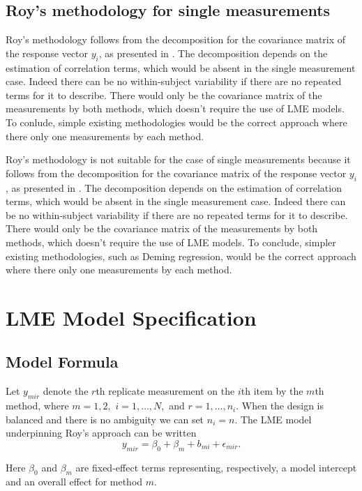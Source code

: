 \documentclass[12pt, a4paper]{report}
\theoremstyle{plain}
\theoremstyle{definition}
\theoremstyle{remark}
\begin{document}
	
	\subsection{Roy's methodology for single measurements}
	Roy's methodology follows from the decomposition for the covariance matrix of the response vector $y_{i}$, as presented in \citet{hamlett}. The decomposition depends on the estimation of correlation terms, which would be absent in the single measurement case. Indeed there can be no within-subject variability if there are no repeated terms for it to describe. There would only be the covariance matrix of the measurements by both methods, which doesn't require the use of LME models. To conlude, simple existing methodologies would be the correct approach where there only one measurements by each method.
	
	Roy's methodology is not suitable for the case of single measurements because it follows from the decomposition for the covariance matrix of the response vector $y_{i}$, as presented in \citet{hamlett}. The decomposition depends on the estimation of correlation terms, which would be absent in the single measurement case. Indeed there can be no within-subject variability if there are no repeated terms for it to describe. There would only be the covariance matrix of the measurements by both methods, which doesn't require the use of LME models. To conclude, simpler existing methodologies, such as Deming regression, would be the correct approach where there only one measurements by each method.
	
	
	\section{LME Model Specification}
	
	
	\subsection{Model Formula}
	
	Let $y_{mir} $ denote the $r$th replicate measurement on the $i$th item by the $m$th method, where $m=1,2,$ $i=1,\ldots,N,$ and $r = 1,\ldots,n_i.$ When the design is balanced and there is no ambiguity we can set $n_i=n.$ The LME model underpinning Roy's approach can be written
	\begin{equation}\label{Roy-model}
	y_{mir} = \beta_{0} + \beta_{m} + b_{mi} + \epsilon_{mir}.
	\end{equation}
	
	Here $\beta_0$ and $\beta_m$ are fixed-effect terms representing, respectively, a model intercept and an overall effect for method $m.$ 
	
\end{document}

